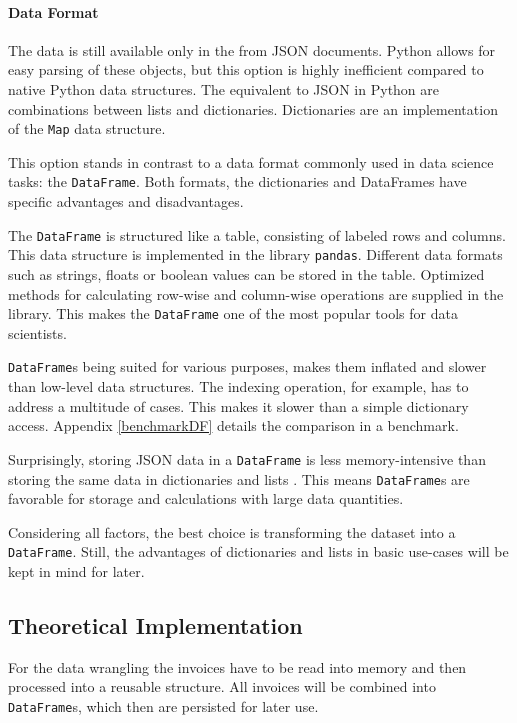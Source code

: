 \begin{table}[ht]
\begin{tabular}{c|lll}
            \end{tabular}
            \label{tabelle:storage}
        \end{table}
        
        \paragraph{Data Format}
        The data is still available only in the from \ac{JSON} documents. Python allows for easy parsing of these objects, but this option is highly inefficient compared to native Python data structures.
        The equivalent to \ac{JSON} in Python are combinations between lists and dictionaries. Dictionaries are an implementation of the \lstinline|Map| data structure.
        
        This option stands in contrast to a data format commonly used in data science tasks: the \lstinline|DataFrame|. Both formats, the dictionaries and DataFrames have specific advantages and disadvantages.
        
        The \lstinline|DataFrame| is structured like a table, consisting of labeled rows and columns. This data structure is implemented in the library \lstinline|pandas|. 
        Different data formats such as strings, floats or boolean values can be stored in the table.        Optimized methods for calculating row-wise and column-wise operations are supplied in the library. This makes the \lstinline|DataFrame| one of the most popular tools for data scientists.
        
       \lstinline|DataFrame|s being suited for various purposes, makes them inflated and slower than low-level data structures. The indexing operation, for example, has to address a multitude of cases. This makes it slower than a simple dictionary access. Appendix \ref{benchmarkDF} details the comparison in a benchmark.
       
       Surprisingly, storing \ac{JSON} data in a \lstinline|DataFrame| is less memory-intensive than storing the same data in dictionaries and lists \cite{DFvsJSON}. This means  \lstinline|DataFrame|s are favorable for storage and calculations with large data quantities.
       
       Considering all factors, the best choice is transforming the dataset into a  \lstinline|DataFrame|. Still, the advantages of dictionaries and lists in basic use-cases will be kept in mind for later.
     
    \subsection{Theoretical Implementation}
    For the data wrangling the invoices have to be read into memory and then processed into a reusable structure. All invoices will be combined into \lstinline|DataFrame|s, which then are persisted for later use.
	
